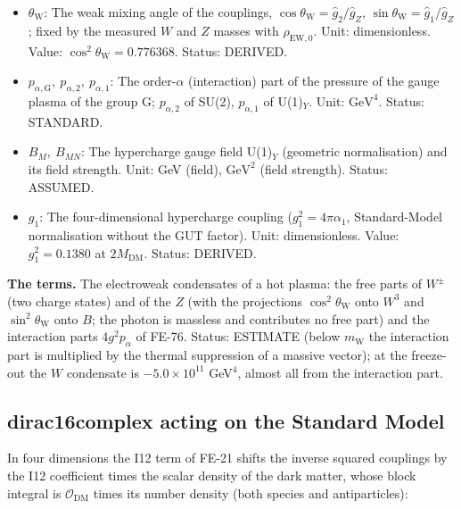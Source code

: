 \documentclass[
  10pt,
]{article}
\begin{document}
\begin{itemize}
  \(Z\)). Unit: \(\mathrm{GeV}^{4}\). Status: STANDARD.
\item
  \(\theta_{\mathrm{W}}\): The weak mixing angle of the couplings,
  \(\cos\theta_{\mathrm{W}} = \hat g_2/\hat g_Z\),
  \(\sin\theta_{\mathrm{W}} = \hat g_1/\hat g_Z\); fixed by the measured
  \(W\) and \(Z\) masses with \(\rho_{\mathrm{EW},0}\). Unit:
  dimensionless. Value: \(\cos^2\theta_{\mathrm{W}} = 0.776368\).
  Status: DERIVED.
\item
  \(p_{\alpha,\mathrm{G}},\ p_{\alpha,2},\ p_{\alpha,1}\): The
  order-\(\alpha\) (interaction) part of the pressure of the gauge
  plasma of the group G; \(p_{\alpha,2}\) of SU(2), \(p_{\alpha,1}\) of
  U(1)\(_Y\). Unit: \(\mathrm{GeV}^{4}\). Status: STANDARD.
\item
  \(B_M,\ B_{MN}\): The hypercharge gauge field U(1)\(_Y\) (geometric
  normalisation) and its field strength. Unit: GeV (field),
  \(\mathrm{GeV}^{2}\) (field strength). Status: ASSUMED.
\item
  \(g_1\): The four-dimensional hypercharge coupling
  (\(g_1^2 = 4\pi\alpha_1\), Standard-Model normalisation without the
  GUT factor). Unit: dimensionless. Value: \(g_1^2 = 0.1380\) at
  \(2M_{\mathrm{DM}}\). Status: DERIVED.
\end{itemize}

\textbf{The terms.} The electroweak condensates of a hot plasma: the
free parts of \(W^\pm\) (two charge states) and of the \(Z\) (with the
projections \(\cos^2\theta_{\mathrm{W}}\) onto \(W^3\) and
\(\sin^2\theta_{\mathrm{W}}\) onto \(B\); the photon is massless and
contributes no free part) and the interaction parts \(4g^2p_\alpha\) of
FE-76. Status: ESTIMATE (below \(m_{\mathrm{W}}\) the interaction part
is multiplied by the thermal suppression of a massive vector); at the
freeze-out the \(W\) condensate is \(-5.0\times10^{11}\) GeV\(^4\),
almost all from the interaction part.

\hypertarget{dirac16complex-acting-on-the-standard-model}{%
\subsection{dirac16complex acting on the Standard
Model}\label{dirac16complex-acting-on-the-standard-model}}

In four dimensions the I12 term of FE-21 shifts the inverse squared
couplings by the I12 coefficient times the scalar density of the dark
matter, whose block integral is \(\mathcal{O}_{\mathrm{DM}}\) times its
number density (both species and antiparticles):
\end{document}
